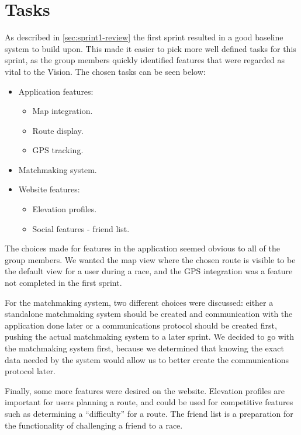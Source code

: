 \section{Tasks}
\label{sec:sprint2-tasks}

As described in \autoref{sec:sprint1-review} the first sprint resulted in a good baseline system to build upon. This made it easier to pick more well defined tasks for this sprint, as the group members quickly identified features that were regarded as vital to the Vision. The chosen tasks can be seen below:

\begin{itemize}
	\item Application features:
	\begin{itemize}
		\item Map integration.
		\item Route display.
		\item \ac{GPS} tracking.
	\end{itemize}
	\item Matchmaking system.
	\item Website features:
	\begin{itemize}
		\item Elevation profiles.
		\item Social features - friend list.
	\end{itemize}
\end{itemize}

The choices made for features in the application seemed obvious to all of the group members. We wanted the map view where the chosen route is visible to be the default view for a user during a race, and the \ac{GPS} integration was a feature not completed in the first sprint.

For the matchmaking system, two different choices were discussed: either a standalone matchmaking system should be created and communication with the application done later or a communications protocol should be created first, pushing the actual matchmaking system to a later sprint. We decided to go with the matchmaking system first, because we determined that knowing the exact data needed by the system would allow us to better create the communications protocol later.

Finally, some more features were desired on the website. Elevation profiles are important for users planning a route, and could be used for competitive features such as determining a ``difficulty'' for a route. The friend list is a preparation for the functionality of challenging a friend to a race.
